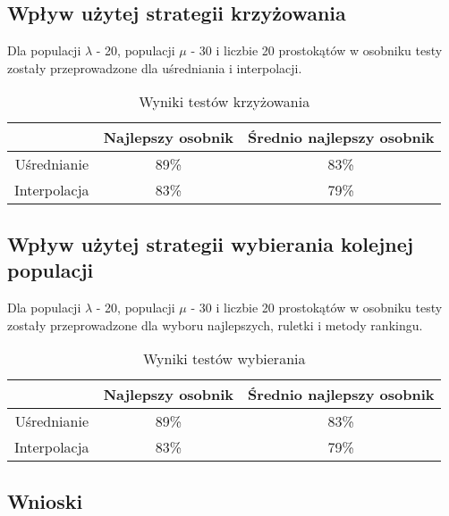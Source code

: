 \subsection*{Wpływ użytej strategii krzyżowania}
Dla populacji $\lambda$ - 20, populacji $\mu$ - 30 i liczbie 20 prostokątów w osobniku testy zostały przeprowadzone dla uśredniania i interpolacji.

\begin{table}[]
    \centering
    \begin{tabular}{|c|c|c|}
    \hline
                 & Najlepszy osobnik & Średnio najlepszy osobnik \\ \hline
    Uśrednianie  & 89\%              & 83\%                      \\ \hline
    Interpolacja & 83\%              & 79\%                      \\ \hline
    \end{tabular}
    \caption{Wyniki testów krzyżowania}
    \label{tab:crossing}
\end{table}

\subsection*{Wpływ użytej strategii wybierania kolejnej populacji}
Dla populacji $\lambda$ - 20, populacji $\mu$ - 30 i liczbie 20 prostokątów w osobniku testy zostały przeprowadzone dla wyboru najlepszych, ruletki i metody rankingu.

\begin{table}[]
    \centering
    \begin{tabular}{|c|c|c|}
    \hline
                 & Najlepszy osobnik & Średnio najlepszy osobnik \\ \hline
    Uśrednianie  & 89\%              & 83\%                      \\ \hline
    Interpolacja & 83\%              & 79\%                      \\ \hline
    \end{tabular}
    \caption{Wyniki testów wybierania}
    \label{tab:picking}
\end{table}

\subsection{Wnioski}